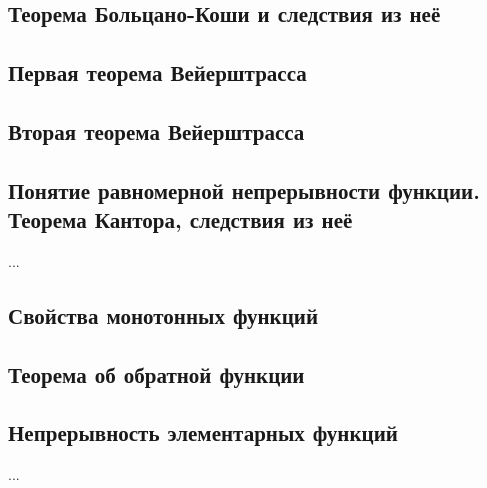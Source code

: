 \subsection{Теорема Больцано-Коши и следствия из неё}
\subsection{Первая теорема Вейерштрасса}
\subsection{Вторая теорема Вейерштрасса}
\subsection{Понятие равномерной непрерывности функции. Теорема Кантора, следствия из неё}
...
\subsection{Свойства монотонных функций}

\subsection{Теорема об обратной функции}
\subsection{Непрерывность элементарных функций}
...

